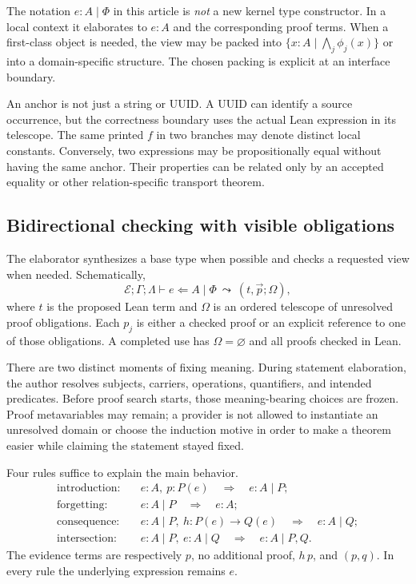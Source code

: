 \documentclass[11pt,letterpaper]{article}
\theoremstyle{remark}
\begin{document}
The notation $e:A\mid\Phi$ in this article is \emph{not} a new kernel type
constructor. In a local context it elaborates to $e:A$ and the corresponding
proof terms. When a first-class object is needed, the view may be packed into
$\{x:A\mid\bigwedge_j\phi_j(x)\}$ or into a domain-specific structure.
The chosen packing is explicit at an interface boundary.

An anchor is not just a string or UUID. A UUID can identify a source occurrence,
but the correctness boundary uses the actual Lean expression in its telescope.
The same printed $f$ in two branches may denote distinct local constants.
Conversely, two expressions may be propositionally equal without having the
same anchor. Their properties can be related only by an accepted equality or
other relation-specific transport theorem.

\subsection{Bidirectional checking with visible obligations}
The elaborator synthesizes a base type when possible and checks a requested
view when needed. Schematically,
\[
 \mathcal E;\Gamma;\Lambda\vdash e
   \Leftarrow A\mid\Phi\ \leadsto\ (t,\vec p;\Omega),
\]
where $t$ is the proposed Lean term and $\Omega$ is an ordered telescope of
unresolved proof obligations. Each $p_j$ is either a checked proof or an
explicit reference to one of those obligations. A completed use has
$\Omega=\varnothing$ and all proofs checked in Lean.

There are two distinct moments of fixing meaning. During statement elaboration,
the author resolves subjects, carriers, operations, quantifiers, and intended
predicates. Before proof search starts, those meaning-bearing choices are
frozen. Proof metavariables may remain; a provider is not allowed to instantiate
an unresolved domain or choose the induction motive in order to make a theorem
easier while claiming the statement stayed fixed.

Four rules suffice to explain the main behavior.
\begin{align*}
 \text{introduction:}\quad&
   e:A,\ p:P(e)\quad\Longrightarrow\quad e:A\mid P;\\
 \text{forgetting:}\quad&
   e:A\mid P\quad\Longrightarrow\quad e:A;\\
 \text{consequence:}\quad&
   e:A\mid P,\ h:P(e)\to Q(e)
       \quad\Longrightarrow\quad e:A\mid Q;\\
 \text{intersection:}\quad&
   e:A\mid P,\ e:A\mid Q
       \quad\Longrightarrow\quad e:A\mid P,Q.
\end{align*}
The evidence terms are respectively $p$, no additional proof, $h\,p$, and
$(p,q)$. In every rule the underlying expression remains $e$.
\end{document}
